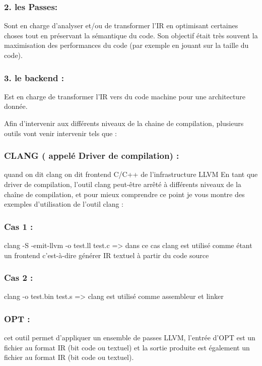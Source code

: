 \documentclass[12pt,titlepage]{article}
\begin{document}
     \subsubsection{2. les Passes: }
     Sont en charge d’analyser et/ou de transformer l’IR en optimisant certaines choses tout en préservant la sémantique du code. Son objectif était très souvent la maximisation des performances du code (par exemple en jouant sur la taille du code).

    \subsubsection{3. le backend :}
    Est en charge de transformer l’IR vers du code machine pour une architecture donnée.

Afin d’intervenir aux différents niveaux de la chaine de compilation, plusieurs outils vont venir intervenir tels que :

   \subsubsection{ CLANG ( appelé Driver de compilation) :} quand on dit clang on dit frontend C/C++ de l’infrastructure LLVM
En tant que driver de compilation, l’outil clang peut-être arrêté à différents niveaux de la chaîne de compilation, et pour mieux comprendre ce point je vous montre des exemples d’utilisation de l’outil clang :
      
\subsubsection {Cas 1 : } clang -S -emit-llvm -o test.ll test.c => dans ce cas clang est utilisé comme étant un frontend c'est-à-dire générer IR textuel à partir du code source 
      
      \subsubsection{Cas 2 : }clang -o test.bin test.s => clang est utilisé comme assembleur et linker 
      
      
    \subsubsection{ OPT :} cet outil permet d’appliquer un ensemble de passes LLVM, l’entrée d'OPT est un fichier au format IR (bit code ou textuel) et la sortie produite est également un fichier au format IR (bit code ou textuel).
      
\end{document}
